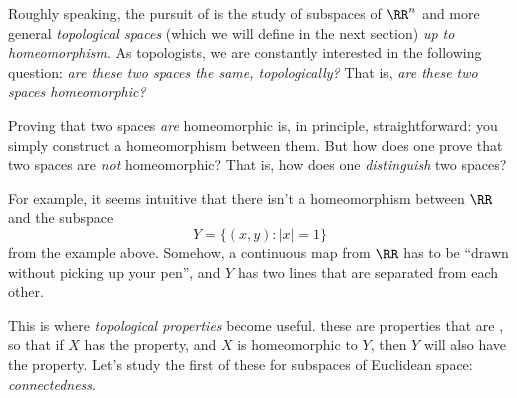 Roughly speaking, the pursuit of  is the study of subspaces of $\RR^n$ and more general \emph{topological spaces} (which we will define in the next section) \emph{up to homeomorphism}.
As topologists, we are constantly interested in the following question: \emph{are these two spaces the same, topologically?}
That is, \emph{are these two spaces homeomorphic?}

Proving that two spaces \emph{are} homeomorphic is, in principle, straightforward:
you simply construct a homeomorphism between them.%
But how does one prove that two spaces are \emph{not} homeomorphic?
That is, how does one \emph{distinguish} two spaces?

For example, it seems intuitive that there isn't a homeomorphism between $\RR$ and the subspace
\[
	Y = \{ (x,y) : |x|=1\}
\]
from the example above.
Somehow, a continuous map from $\RR$ has to be \enquote{drawn without picking up your pen},
and $Y$ has two lines that are separated from each other.

This is where \emph{topological properties} become useful.
these are properties that are , so that if $X$ has the property, and $X$ is homeomorphic to $Y$, then $Y$ will also have the property.
Let's study the first of these for subspaces of Euclidean space: \emph{connectedness}.

